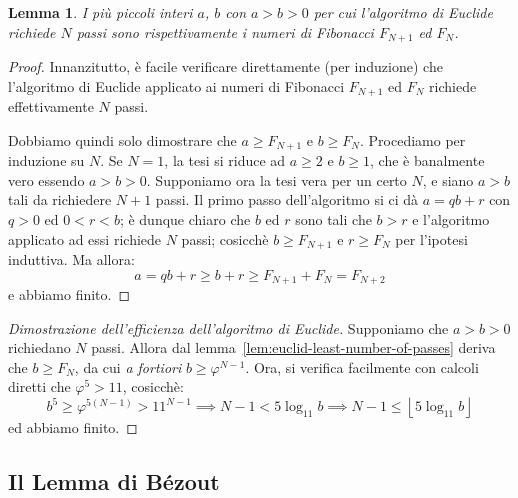 \documentclass[pdflatex,11pt,a4paper,oneside]{article}
\let\OldEmph\emph
\renewcommand{\emph}[1]{\OldEmph{#1\/}}
\let\gold=\varphi
\newcommand{\floor}[1]{\left\lfloor{#1}\right\rfloor}
\newtheorem{lemma}[TheoremLike]{Lemma}
\begin{document}
\begin{lemma}\label{lem:euclid-least-number-of-passes}
I pi\`u piccoli interi $a$, $b$ con $a > b > 0$ per cui l'algoritmo di
Euclide richiede $N$ passi sono rispettivamente i numeri di Fibonacci
$F_{N+1}$ ed $F_{N}$.
\end{lemma}
%
\begin{proof}
Innanzitutto, \`e facile verificare direttamente (per induzione) che
l'algoritmo di Euclide applicato ai numeri di Fibonacci $F_{N+1}$ ed
$F_{N}$ richiede effettivamente $N$ passi.

Dobbiamo quindi solo dimostrare che $a \geq F_{N+1}$ e $b \geq F_N$.
Procediamo per induzione su $N$. Se $N = 1$, la tesi si riduce ad
$a \geq 2$ e $b \geq 1$, che \`e banalmente vero essendo $a > b > 0$.
Supponiamo ora la tesi vera per un certo $N$, e siano $a > b$ tali da
richiedere $N + 1$ passi. Il primo passo dell'algoritmo si ci d\`a
$a = qb + r$ con $q > 0$ ed $0 < r < b$; \`e dunque chiaro che $b$ ed
$r$ sono tali che $b > r$ e l'algoritmo applicato ad essi richiede
$N$ passi; cosicch\`e $b \geq F_{N+1}$ e $r \geq F_N$ per l'ipotesi
induttiva. Ma allora:
 $$ a = qb + r \geq b + r \geq F_{N+1} + F_N = F_{N+2}$$
e abbiamo finito.
\end{proof}

\begin{proof}[Dimostrazione dell'efficienza dell'algoritmo di Euclide]
Supponiamo che $a > b > 0$ richiedano $N$ passi.  Allora dal
lemma~\eqref{lem:euclid-least-number-of-passes} deriva che $b \geq F_N$,
da cui \emph{a fortiori} $b \geq \gold^{N-1}$.  Ora, si verifica
facilmente con calcoli diretti che $\gold^5 > 11$, cosicch\`e:
\begin{displaymath}
 b^5 \geq \gold^{5(N-1)} > 11^{N-1}
   \implies N - 1 < 5 \log_{11} b
   \implies N - 1 \leq \floor{5 \log_{11} b}
\end{displaymath}
ed abbiamo finito.
\end{proof}


\subsection{Il Lemma di B\'ezout}
\end{document}
